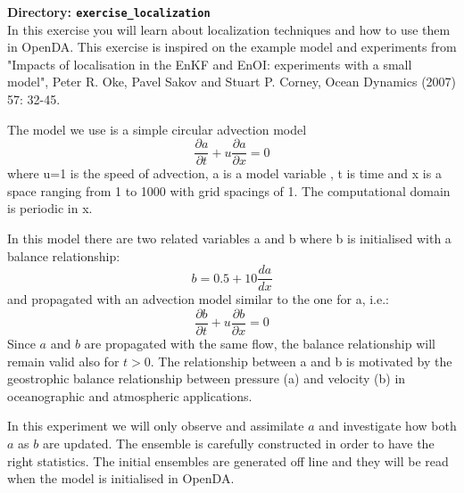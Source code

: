 {\bf Directory: {\tt exercise\_localization}}\\

In this exercise you will learn about localization techniques and how to use them in OpenDA. This exercise is inspired on the example model and experiments from "Impacts of localisation in the EnKF and EnOI: experiments with a small model", Peter R. Oke, Pavel Sakov and Stuart P. Corney, Ocean Dynamics (2007) 57: 32-45.

The model we use is a simple circular advection model 
\begin{equation}
\frac{\partial a}{\partial t}+u\frac{\partial a}{\partial x}=0
\end{equation}
where u=1 is the speed of advection, a is a model variable , t is time and x is a space ranging from 1 to 1000 with grid spacings of 1. The computational domain is periodic in x.

In this model there are two related variables a and b where b is initialised with a balance relationship:
\begin{equation}\label{eg:b_relation}
b= 0.5 + 10 \frac{da}{dx}
\end{equation}
and propagated with an advection model similar to the one for a, i.e.:
\begin{equation}
\frac{\partial b}{\partial t}+u\frac{\partial b}{\partial x}=0
\end{equation}
Since $a$ and $b$ are propagated with the same flow, the balance relationship will remain valid also for $t>0$.
The relationship between a and b is motivated by the geostrophic balance relationship between pressure (a) and velocity (b) in oceanographic and atmospheric applications. 

In this experiment we will only observe and assimilate $a$ and investigate how both $a$ as $b$ are updated. 
The ensemble is carefully constructed in order to have the right statistics. The initial ensembles are generated off line and they will be read when the model is initialised in OpenDA. 

